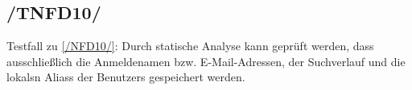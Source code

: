\subsection*{/TNFD10/}
\label{/TNFD10/} Testfall zu \ref{/NFD10/}: Durch \gls{statische Analyse} kann geprüft werden, dass ausschließlich die Anmeldenamen bzw. E-Mail-Adressen, der \Gls{Suchverlauf} und die \glspl{lokal}n \Glspl{Alias} der \Glspl{Benutzer} gespeichert werden.